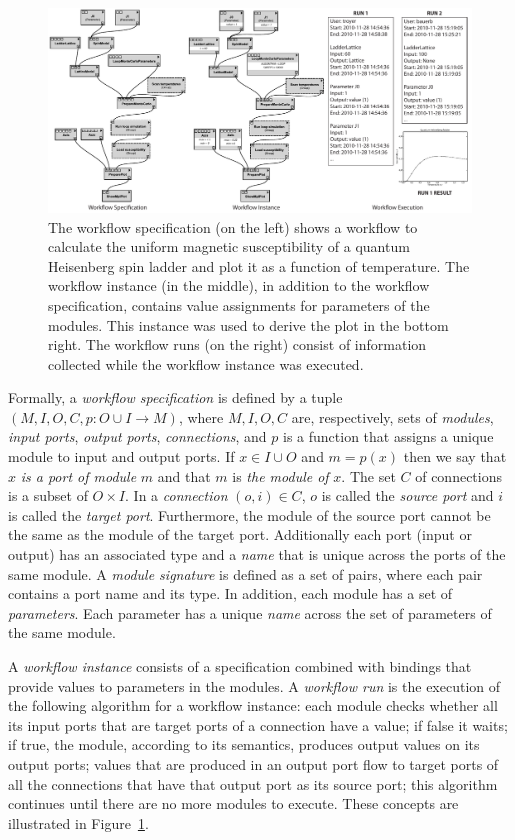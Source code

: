 \documentclass[12pt]{iopart}
\begin{document}
\begin{figure}[t]
\includegraphics[width=\linewidth]{figures/alps_provenance_types.pdf}
\caption{The workflow specification (on the left) shows a workflow to calculate the uniform magnetic susceptibility of a quantum Heisenberg spin ladder and plot it as a function of temperature.
 The workflow
  instance (in the middle), in addition to the workflow specification,
  contains value assignments for parameters of the modules. This
  instance was used to derive the plot in the bottom right. The
  workflow runs (on the right) consist of information collected while
  the workflow instance was executed. }
\vspace{0cm}
\label{fig:workflow-spec-run}
\end{figure}

Formally, a \emph{workflow specification} is defined by a tuple
$(M,I,O,C,p:O \cup I \rightarrow M)$, where $M, I, O, C$ are,
respectively, sets of {\it modules}, {\it input ports}, {\it output
  ports}, {\it connections}, and $p$ is a function that assigns a
unique module to input and output ports.  If $x \in I \cup O$ and $m =
p(x)$ then we say that $x$ {\it is a port of module} $m$ and that $m$
is {\it the module of} $x$.  The set $C$ of connections is a subset of
$O \times I$.  In a {\it connection} $(o,i) \in C$, $o$ is called the
{\it source port} and $i$ is called the {\it target
  port}. Furthermore, the module of the source port cannot be the same
as the module of the target port.  Additionally each port (input
or output) has an associated type and a {\it name} that is unique
across the ports of the same module.  A {\it module signature} is
defined as a set of pairs, where each pair contains a port name and
its type.  In addition, each module has a set of {\it parameters}.  Each parameter
has a unique {\it name} across the set of parameters of the same
module.

A \emph{workflow instance} consists of a specification combined with
bindings that provide values to parameters in the modules.  A {\it
  workflow run} is the execution of the following algorithm for a
workflow instance: each module checks whether all its input ports that
are target ports of a connection have a value; if false it waits; if
true, the module, according to its semantics, produces output values
on its output ports; values that are produced in an output port flow
to target ports of all the connections that have that output port as
its source port; this algorithm continues until there are no more
modules to execute.
%
These concepts are illustrated in Figure~\ref{fig:workflow-spec-run}.
\end{document}
